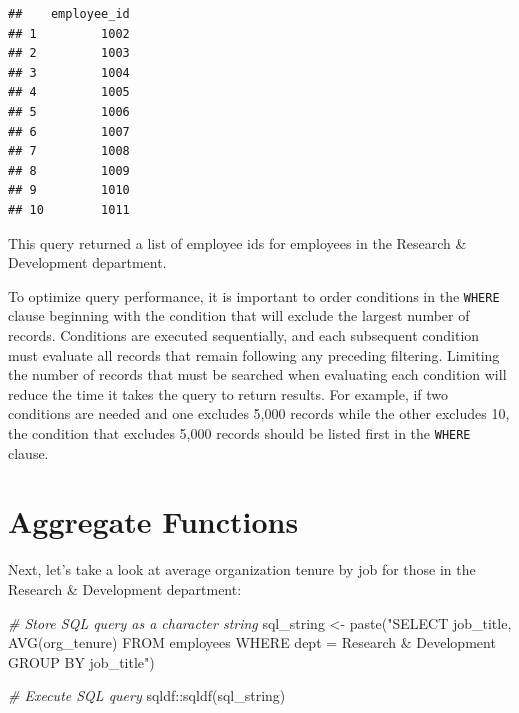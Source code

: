 \documentclass[
]{book}
\newenvironment{Shaded}{\begin{snugshade}}{\end{snugshade}}
\newcommand{\CommentTok}[1]{\textcolor[rgb]{0.56,0.35,0.01}{\textit{#1}}}
\newcommand{\FunctionTok}[1]{\textcolor[rgb]{0.00,0.00,0.00}{#1}}
\newcommand{\NormalTok}[1]{#1}
\newcommand{\OtherTok}[1]{\textcolor[rgb]{0.56,0.35,0.01}{#1}}
\newcommand{\SpecialCharTok}[1]{\textcolor[rgb]{0.00,0.00,0.00}{#1}}
\newcommand{\StringTok}[1]{\textcolor[rgb]{0.31,0.60,0.02}{#1}}
\begin{document}
\begin{verbatim}
##    employee_id
## 1         1002
## 2         1003
## 3         1004
## 4         1005
## 5         1006
## 6         1007
## 7         1008
## 8         1009
## 9         1010
## 10        1011
\end{verbatim}

This query returned a list of employee ids for employees in the Research \& Development department.

To optimize query performance, it is important to order conditions in the \texttt{WHERE} clause beginning with the condition that will exclude the largest number of records. Conditions are executed sequentially, and each subsequent condition must evaluate all records that remain following any preceding filtering. Limiting the number of records that must be searched when evaluating each condition will reduce the time it takes the query to return results. For example, if two conditions are needed and one excludes 5,000 records while the other excludes 10, the condition that excludes 5,000 records should be listed first in the \texttt{WHERE} clause.

\hypertarget{aggregate-functions}{%
\section{Aggregate Functions}\label{aggregate-functions}}

Next, let's take a look at average organization tenure by job for those in the Research \& Development department:

\begin{Shaded}
\begin{Highlighting}[]
\CommentTok{\# Store SQL query as a character string}
\NormalTok{sql\_string }\OtherTok{\textless{}{-}} \FunctionTok{paste}\NormalTok{(}\StringTok{"SELECT}
\StringTok{                      job\_title,}
\StringTok{                      AVG(org\_tenure)}
\StringTok{                    FROM}
\StringTok{                      employees}
\StringTok{                    WHERE}
\StringTok{                      dept = \textquotesingle{}Research \& Development\textquotesingle{}}
\StringTok{                    GROUP BY}
\StringTok{                      job\_title"}\NormalTok{)}

\CommentTok{\# Execute SQL query}
\NormalTok{sqldf}\SpecialCharTok{::}\FunctionTok{sqldf}\NormalTok{(sql\_string)}
\end{Highlighting}
\end{Shaded}
\end{document}

